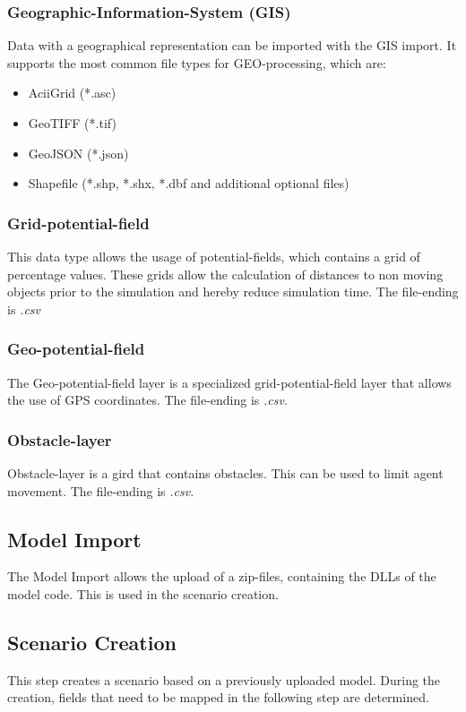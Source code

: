 \subsubsection{Geographic-Information-System (GIS)}
Data with a geographical representation can be imported with the GIS import. It supports the most common file types for GEO-processing, which are:
\begin{itemize}
	\item AciiGrid (*.asc)
	\item GeoTIFF (*.tif)
	\item GeoJSON (*.json)
	\item Shapefile (*.shp, *.shx, *.dbf and additional optional files)
\end{itemize}

\subsubsection{Grid-potential-field}
This data type allows the usage of potential-fields, which contains a grid of percentage values. These grids allow the calculation of distances to non moving objects prior to the simulation and hereby reduce simulation time. The file-ending is \textit{.csv}

\subsubsection{Geo-potential-field}
The Geo-potential-field layer is a specialized grid-potential-field layer that allows the use of GPS coordinates. The file-ending is \textit{.csv}.

\subsubsection{Obstacle-layer}
Obstacle-layer is a gird that contains obstacles. This can be used to limit agent movement. The file-ending is \textit{.csv}.


\subsection{Model Import}
The Model Import allows the upload of a zip-files, containing the DLLs of the model code. This is used in the scenario creation.


\subsection{Scenario Creation}
This step creates a scenario based on a previously uploaded model. During the creation, fields that need to be mapped in the following step are determined.


